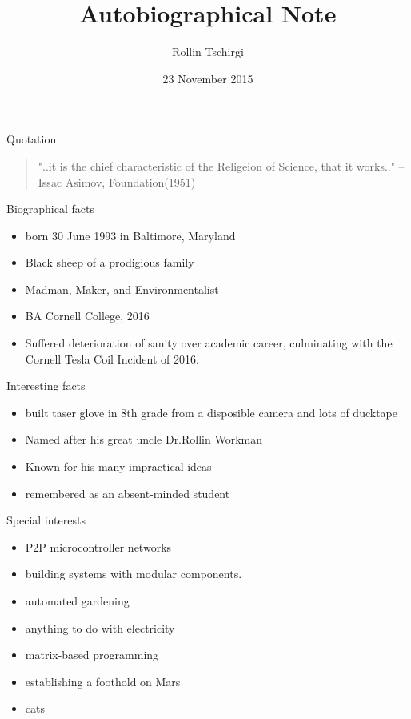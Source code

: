 \documentclass{beamer}
\title{Autobiographical Note}
\author{Rollin Tschirgi}
\institute{Cornell College}
\date{23 November 2015}
\begin{document}
\begin{frame}
  \titlepage
\end{frame}

\begin{frame}{Quotation}
\begin{quotation}
\noindent
"..it is the chief characteristic of the Religeion of Science, that it works.."
  \flushright
  --Issac Asimov, Foundation(1951)
  \end{quotation}
\end{frame}

\begin{frame}{Biographical facts}
\begin{itemize}
  \item born 30 June 1993 in Baltimore, Maryland
  \item Black sheep of a prodigious family
  \item Madman, Maker, and Environmentalist
  \item BA Cornell College, 2016
  \item Suffered deterioration of sanity over academic career, culminating with the Cornell Tesla Coil Incident of 2016.
  \end{itemize}
\end{frame}

\begin{frame}{Interesting facts}
\begin{itemize}
  \item built taser glove in 8th grade from a disposible camera and lots of ducktape
  \item Named after his great uncle Dr.Rollin Workman
  \item Known for his many impractical ideas
  \item remembered as an absent-minded student
  \end{itemize}
\end{frame}

\begin{frame}{Special interests}

\begin{itemize}
  \item P2P microcontroller networks
  \item building systems with modular components.
  \item automated gardening
  \item anything to do with electricity
  \item matrix-based programming
  \item establishing a foothold on Mars
  \item cats
\end{itemize}
\end{frame}
\end{document}
